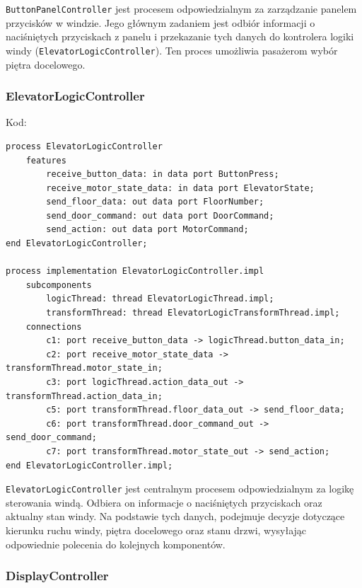 \documentclass{article}
\begin{document}
    \texttt{ButtonPanelController} jest procesem odpowiedzialnym za zarządzanie panelem przycisków w windzie. Jego głównym zadaniem jest odbiór informacji o naciśniętych przyciskach z panelu i przekazanie tych danych do kontrolera logiki windy (\texttt{ElevatorLogicController}). Ten proces umożliwia pasażerom wybór piętra docelowego.





    \subsubsection{ElevatorLogicController}

    Kod:
    
    \begin{lstlisting}[basicstyle=\ttfamily, keywordstyle=\bfseries]
process ElevatorLogicController
    features
        receive_button_data: in data port ButtonPress;
        receive_motor_state_data: in data port ElevatorState;
        send_floor_data: out data port FloorNumber;
        send_door_command: out data port DoorCommand;
        send_action: out data port MotorCommand;
end ElevatorLogicController;

process implementation ElevatorLogicController.impl
    subcomponents
        logicThread: thread ElevatorLogicThread.impl;
        transformThread: thread ElevatorLogicTransformThread.impl;
    connections
        c1: port receive_button_data -> logicThread.button_data_in;
        c2: port receive_motor_state_data -> transformThread.motor_state_in;
        c3: port logicThread.action_data_out -> transformThread.action_data_in;
        c5: port transformThread.floor_data_out -> send_floor_data;
        c6: port transformThread.door_command_out -> send_door_command;
        c7: port transformThread.motor_state_out -> send_action; 
end ElevatorLogicController.impl;
    \end{lstlisting}

    \texttt{ElevatorLogicController}  jest centralnym procesem odpowiedzialnym za logikę sterowania windą. Odbiera on informacje o naciśniętych przyciskach oraz aktualny stan windy. Na podstawie tych danych, podejmuje decyzje dotyczące kierunku ruchu windy, piętra docelowego oraz stanu drzwi, wysyłając odpowiednie polecenia do kolejnych komponentów.



    \newpage

    \subsubsection{DisplayController}
\end{document}
